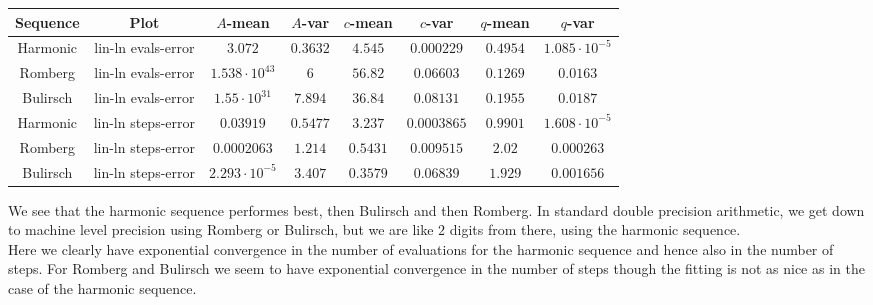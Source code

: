 \begin{table}[H]
    \centering
    \small
    \begin{tabular}{c|c||c|c|c|c|c	|c}
Sequence & Plot & \(A\)-mean & \(A\)-var & \(c\)-mean & \(c\)-var & \(q\)-mean & \(q\)-var\\\hline
\rowcolor{green}
Harmonic & lin-ln evals-error & \(3.072\) & \(0.3632\) & \(4.545\) & \(0.000229\) & \(0.4954\) & \(1.085\cdot 10^{-5}\) \\
\rowcolor{red}
Romberg & lin-ln evals-error & \(1.538\cdot 10^{43}\) & \(6\) & \(56.82\) & \(0.06603\) & \(0.1269\) & \(0.0163\) \\
\rowcolor{red}
Bulirsch & lin-ln evals-error & \(1.55\cdot 10^{31}\) & \(7.894\) & \(36.84\) & \(0.08131\) & \(0.1955\) & \(0.0187\) \\
\rowcolor{green}
Harmonic & lin-ln steps-error & \(0.03919\) & \(0.5477\) & \(3.237\) & \(0.0003865\) & \(0.9901\) & \(1.608\cdot 10^{-5}\) \\
\rowcolor{yellow}
Romberg & lin-ln steps-error & \(0.0002063\) & \(1.214\) & \(0.5431\) & \(0.009515\) & \(2.02\) & \(0.000263\) \\
\rowcolor{yellow}
Bulirsch & lin-ln steps-error & \(2.293\cdot 10^{-5}\) & \(3.407\) & \(0.3579\) & \(0.06839\) & \(1.929\) & \(0.001656\) \\
    \end{tabular}
    \label{tab:my_label}
\end{table}

We see that the harmonic sequence performes best, then Bulirsch and then Romberg. In standard double precision arithmetic, we get down to machine level precision using Romberg or Bulirsch, but we are like \(2\) digits from there, using the harmonic sequence.\\

Here we clearly have exponential convergence in the number of evaluations for the harmonic sequence and hence also in the number of steps. For Romberg and Bulirsch we seem to have exponential convergence in the number of steps though the fitting is not as nice as in the case of the harmonic sequence.


